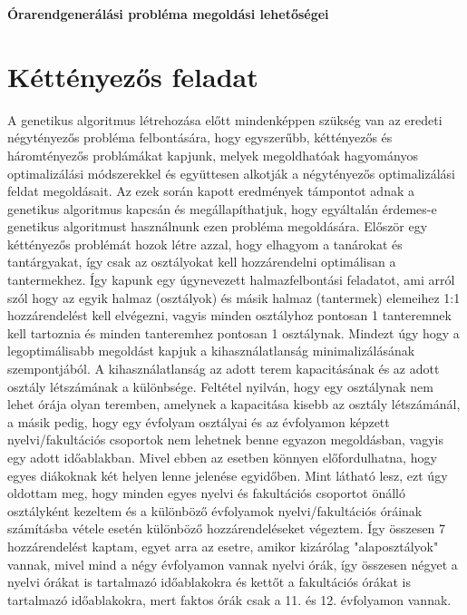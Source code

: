 \documentclass[a4paper,12pt]{article}
\begin{document}
\begin{center}
    \huge \textbf{Órarendgenerálási probléma megoldási lehetőségei} 
\end{center}

\section{Kéttényezős feladat}

A genetikus algoritmus létrehozása előtt mindenképpen szükség van az eredeti  négytényezős 
probléma felbontására, hogy egyszerűbb, kéttényezős és háromtényezős problámákat 
kapjunk, melyek megoldhatóak hagyományos optimalizálási módszerekkel és együttesen 
alkotják a négytényezős optimalizálási feldat megoldásait. Az ezek során kapott eredmények
támpontot adnak a genetikus algoritmus kapcsán és megállapíthatjuk, hogy egyáltalán
érdemes-e genetikus algoritmust használnunk ezen probléma megoldására. Először egy 
kéttényezős problémát hozok létre azzal, hogy elhagyom a tanárokat és tantárgyakat, így csak
az osztályokat kell hozzárendelni optimálisan a tantermekhez. Így kapunk egy úgynevezett
halmazfelbontási feladatot, ami arról szól hogy az egyik halmaz (osztályok) és másik halmaz 
(tantermek) elemeihez 1:1 hozzárendelést kell elvégezni, vagyis minden osztályhoz pontosan 1
tanteremnek kell tartoznia és minden tanteremhez pontosan 1 osztálynak. Mindezt úgy hogy a
legoptimálisabb megoldást kapjuk a kihasználatlanság minimalizálásának szempontjából. A
kihasználatlanság az adott terem kapacitásának és az adott osztály létszámának a különbsége.
Feltétel nyilván, hogy egy osztálynak nem lehet órája olyan teremben, amelynek a kapacitása
kisebb az osztály létszámánál, a másik pedig, hogy egy évfolyam osztályai és az évfolyamon 
képzett nyelvi/fakultációs csoportok nem lehetnek benne egyazon megoldásban, vagyis egy
adott időablakban. Mivel ebben az esetben könnyen előfordulhatna, hogy egyes diákoknak 
két helyen lenne jelenése egyidőben. Mint látható lesz, ezt úgy oldottam meg, hogy minden
egyes nyelvi és fakultációs csoportot önálló osztályként kezeltem és a különböző évfolyamok
nyelvi/fakultációs óráinak számításba vétele esetén különböző hozzárendeléseket végeztem. 
Így összesen 7 hozzárendelést kaptam, egyet arra az esetre, amikor kizárólag "alaposztályok" 
vannak, mivel mind a négy évfolyamon vannak nyelvi órák, így összesen négyet a nyelvi 
órákat is tartalmazó időablakokra és kettőt a fakultációs órákat is tartalmazó időablakokra, 
mert faktos órák csak a 11. és 12. évfolyamon vannak. 
\end{document}
